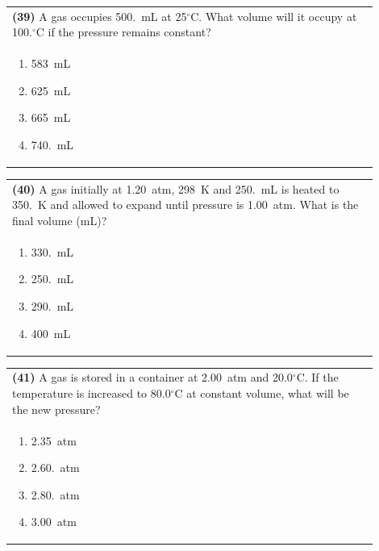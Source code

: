 \documentclass{article}
\begin{document}
\vspace{0.2cm}
\noindent\begin{tabular}{|p{0.9\linewidth}|}
\hline
\textbf{(39)} A gas occupies 500.~mL at 25$^\circ$C. What volume will it occupy at 100.$^\circ$C if the pressure remains constant? \\[0.2cm]

\begin{minipage}[t]{0.85\linewidth}
\begin{enumerate}[label=\alph*.]
\item 583~mL
\item 625~mL
\item 665~mL
\item 740.~mL
\end{enumerate}
\end{minipage}\\[0.2cm]
\hline
\end{tabular}

\vspace{0.2cm}
\noindent\begin{tabular}{|p{0.9\linewidth}|}
\hline
\textbf{(40)} A gas initially at 1.20~atm, 298~K and 250.~mL is heated to 350.~K and allowed to expand until pressure is 1.00~atm. What is the final volume (mL)?\\[0.2cm]

\begin{minipage}[t]{0.85\linewidth}
\begin{enumerate}[label=\alph*.]
\item 330.~mL
\item 250.~mL
\item 290.~mL
\item 400~mL
\end{enumerate}
\end{minipage}\\[0.2cm]
\hline
\end{tabular}

\newpage

\noindent\begin{tabular}{|p{0.9\linewidth}|}
\hline
\textbf{(41)} A gas is stored in a container at 2.00~atm and 20.0$^\circ$C. If the temperature is increased to 80.0$^\circ$C at constant volume, what will be the new pressure? \\[0.2cm]

\begin{minipage}[t]{0.85\linewidth}
\begin{enumerate}[label=\alph*.]
\item 2.35~atm
\item 2.60.~atm
\item 2.80.~atm
\item 3.00~atm
\end{enumerate}
\end{minipage}\\[0.2cm]
\hline
\end{tabular}
\end{document}
